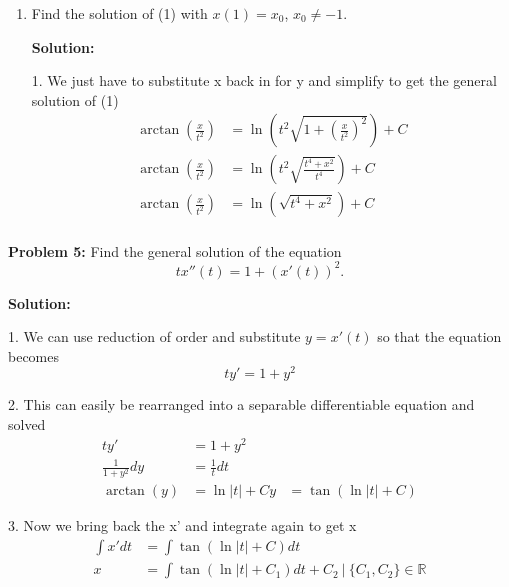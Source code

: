 \documentclass[12pt]{article}
\begin{document}
\begin{enumerate}
    \item[(c)] Find the solution of (1) with $x(1) = x_0$, $x_0 \neq -1$.

          \textbf{Solution:}

          1. We just have to substitute x back in for y and simplify to get the general solution of (1)
          \begin{align*}
              \arctan{(\frac{x}{t^2})} & = \ln{(t^2\sqrt{1+(\frac{x}{t^2})^2})} + C \\
              \arctan{(\frac{x}{t^2})} & = \ln{(t^2\sqrt{\frac{t^4+x^2}{t^4}})} + C \\
              \arctan{(\frac{x}{t^2})} & = \ln{(\sqrt{t^4+x^2})} + C                \\
          \end{align*}
\end{enumerate}

\newpage

\noindent \textbf{Problem 5:} Find the general solution of the equation
\[ tx''(t) = 1 + (x'(t))^2. \]

\textbf{Solution:}

1. We can use reduction of order and substitute $y=x'(t)$ so that the equation becomes
\[
    ty'=1+y^2
\]

2. This can easily be rearranged into a separable differentiable equation and solved
\begin{align*}
    ty'               & = 1+y^2                \\
    \frac{1}{1+y^2}dy & = \frac{1}{t} dt       \\
    \arctan{(y)}      & = \ln{|t|} + C
    y                 & = \tan{(\ln{|t|} + C)}
\end{align*}

3. Now we bring back the x' and integrate again to get x
\begin{align*}
    \int{}x'dt & = \int{}\tan{(\ln{|t|} + C)}dt                                          \\
    x          & = \int{}\tan{(\ln{|t|} + C_1)dt} + C_2 ~|~ \{C_1, C_2\} \in{\mathbb{R}}
\end{align*}
\end{document}

